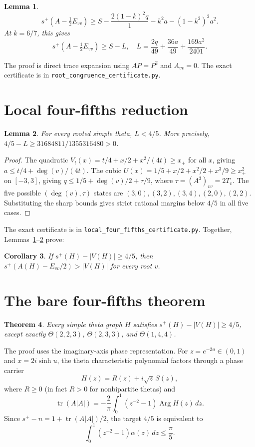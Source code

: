 \documentclass[11pt]{article}
\newtheorem{theorem}{Theorem}
\newtheorem{lemma}[theorem]{Lemma}
\newtheorem{corollary}[theorem]{Corollary}
\begin{document}
\begin{lemma}\label{lem:witness}
\[ s^+\!\left(A-\tfrac12E_{vv}\right)\ge
S-\frac{2(1-k)^2q}{1}-k^2a-(1-k^2)^2a^2. \]
At $k=6/7$, this gives
\[ s^+\!\left(A-\tfrac12E_{vv}\right)\ge S-L, \quad
L=\frac{2q}{49}+\frac{36a}{49}+\frac{169a^2}{2401}. \]
\end{lemma}

The proof is direct trace expansion using $AP=P^2$ and $A_{vv}=0$.
The exact certificate is in \texttt{root\_congruence\_certificate.py}.

\section{Local four-fifths reduction}

\begin{lemma}\label{lem:local}
For every rooted simple theta, $L<4/5$.
More precisely, $4/5-L\ge 31684811/1355316480>0$.
\end{lemma}

\begin{proof}
The quadratic $V_t(x)=t/4+x/2+x^2/(4t)\ge x_+$ for all $x$, giving
$a\le t/4+\deg(v)/(4t)$.
The cubic $U(x)=1/5+x/2+x^2/2+x^3/9\ge x_+^2$ on $[-3,3]$,
giving $q\le 1/5+\deg(v)/2+\tau/9$, where $\tau=(A^3)_{vv}=2T_v$.
The five possible $(\deg(v),\tau)$ states are
$(3,0),(3,2),(3,4),(2,0),(2,2)$.
Substituting the sharp bounds gives strict rational margins below $4/5$
in all five cases.
\end{proof}

The exact certificate is in \texttt{local\_four\_fifths\_certificate.py}.
Together, Lemmas~\ref{lem:witness}--\ref{lem:local} prove:

\begin{corollary}\label{cor:conditional}
If $s^+(H)-|V(H)|\ge 4/5$, then
$s^+(A(H)-E_{vv}/2)>|V(H)|$ for every root $v$.
\end{corollary}

\section{The bare four-fifths theorem}

\begin{theorem}\label{thm:bare}
Every simple theta graph $H$ satisfies $s^+(H)-|V(H)|\ge 4/5$,
except exactly $\Theta(2,2,3)$, $\Theta(2,3,3)$, and $\Theta(1,4,4)$.
\end{theorem}

The proof uses the imaginary-axis phase representation.
For $z=e^{-2u}\in(0,1)$ and $x=2i\sinh u$, the theta characteristic
polynomial factors through a phase carrier
\[ H(z)=R(z)+i\sqrt z\,S(z), \]
where $R\ge0$ (in fact $R>0$ for nonbipartite thetas) and
\[ \operatorname{tr}(A|A|)=-\frac2\pi\int_0^1(z^{-2}-1)\operatorname{Arg} H(z)\,dz. \]
Since $s^+-n=1+\operatorname{tr}(A|A|)/2$, the target $4/5$ is equivalent to
\[ \int_0^1(z^{-2}-1)\alpha(z)\,dz\le\frac\pi5. \]
\end{document}
